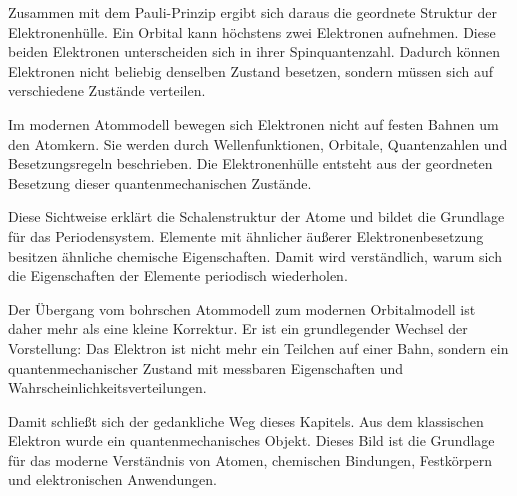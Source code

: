 Zusammen mit dem Pauli-Prinzip ergibt sich daraus die
geordnete Struktur der Elektronenhülle. Ein Orbital kann höchstens zwei
Elektronen aufnehmen. Diese beiden Elektronen unterscheiden sich in ihrer
Spinquantenzahl. Dadurch können Elektronen nicht beliebig denselben Zustand
besetzen, sondern müssen sich auf verschiedene Zustände verteilen.

\begin{PhysicsBox}
	\label{box:modernes_atommodell}
	Im modernen Atommodell bewegen sich Elektronen nicht auf festen Bahnen um den
	Atomkern. Sie werden durch Wellenfunktionen, Orbitale, Quantenzahlen und
	Besetzungsregeln beschrieben. Die Elektronenhülle entsteht aus der geordneten
	Besetzung dieser quantenmechanischen Zustände.
\end{PhysicsBox}

Diese Sichtweise erklärt die Schalenstruktur der Atome
und bildet die Grundlage für das Periodensystem. Elemente
mit ähnlicher äußerer Elektronenbesetzung besitzen ähnliche chemische
Eigenschaften. Damit wird verständlich, warum sich
die Eigenschaften der Elemente periodisch wiederholen.

Der Übergang vom bohrschen Atommodell zum modernen Orbitalmodell ist daher mehr
als eine kleine Korrektur. Er ist ein grundlegender Wechsel der Vorstellung:
Das Elektron ist nicht mehr ein Teilchen auf einer Bahn, sondern ein
quantenmechanischer Zustand mit messbaren Eigenschaften und
Wahrscheinlichkeitsverteilungen.

Damit schließt sich der gedankliche Weg dieses Kapitels. Aus dem klassischen
Elektron wurde ein quantenmechanisches Objekt.
Dieses Bild ist die Grundlage für das moderne Verständnis von Atomen,
chemischen Bindungen, Festkörpern
und elektronischen Anwendungen.